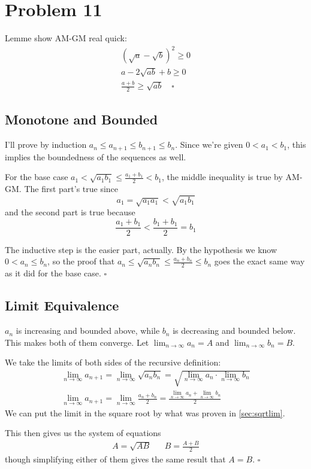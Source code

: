 \documentclass[12pt]{article}
\begin{document}
\section{Problem 11}

Lemme show AM-GM real quick:
\begin{gather*}
  \left(\sqrt{a}-\sqrt{b}\right)^2 \ge 0 \\
  a-2\sqrt{ab}+b \ge 0 \\
  \frac{a+b}{2} \ge \sqrt{ab}\quad\square
\end{gather*}

\subsection{Monotone and Bounded}

I'll prove by induction $a_n \le a_{n+1} \le b_{n+1} \le b_n$.
Since we're given $0 < a_1 < b_1$, this implies the boundedness of the sequences as well.

For the base case $a_1 < \sqrt{a_1b_1} \le \frac{a_1+b_1}{2} < b_1$,
the middle inequality is true by AM-GM.
The first part's true since
\[a_1 = \sqrt{a_1a_1} < \sqrt{a_1b_1}\]
and the second part is true because
\[\frac{a_1+b_1}{2} < \frac{b_1+b_1}{2}=b_1\]

The inductive step is the easier part, actually.
By the hypothesis we know $0 < a_n \le b_n$, so
the proof that $a_n \le \sqrt{a_nb_n} \le \frac{a_n+b_n}{2} \le b_n$
goes the exact same way as it did for the base case. $\square$

\subsection{Limit Equivalence}

$a_n$ is increasing and bounded above, while $b_n$ is decreasing and bounded below.
This makes both of them converge.
Let $\lim_{n \to \infty} a_n=A$ and $\lim_{n \to \infty} b_n=B$.

We take the limits of both sides of the recursive definition:
\begin{gather*}
  \lim_{n \to \infty} a_{n+1} = \lim_{n \to \infty} \sqrt{a_n b_n} = \sqrt{\lim_{n \to \infty} a_n \cdot \lim_{n \to \infty} b_n} \\
  \lim_{n \to \infty} a_{n+1} = \lim_{n \to \infty} \frac{a_n+b_n}{2} = \frac{\lim_{n \to \infty} a_n + \lim_{n \to \infty} b_n}{2}
\end{gather*}
We can put the limit in the square root by what was proven in \ref{sec:sqrtlim}.

This then gives us the system of equations
\begin{align*}
  A=\sqrt{AB} &  & B=\frac{A+B}{2}
\end{align*}
though simplifying either of them gives the same result that $A=B$. $\square$
\end{document}
